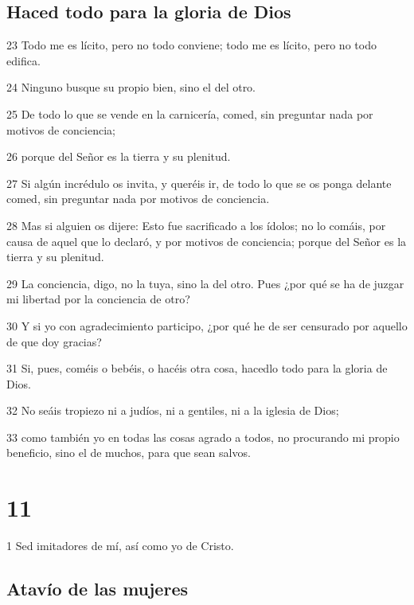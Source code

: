 \section*{Haced todo para la gloria de Dios}

\par 23 Todo me es lícito, pero no todo conviene; todo me es lícito, pero no todo edifica.
\par 24 Ninguno busque su propio bien, sino el del otro.
\par 25 De todo lo que se vende en la carnicería, comed, sin preguntar nada por motivos de conciencia;
\par 26 porque del Señor es la tierra y su plenitud.
\par 27 Si algún incrédulo os invita, y queréis ir, de todo lo que se os ponga delante comed, sin preguntar nada por motivos de conciencia.
\par 28 Mas si alguien os dijere: Esto fue sacrificado a los ídolos; no lo comáis, por causa de aquel que lo declaró, y por motivos de conciencia; porque del Señor es la tierra y su plenitud.
\par 29 La conciencia, digo, no la tuya, sino la del otro. Pues ¿por qué se ha de juzgar mi libertad por la conciencia de otro?
\par 30 Y si yo con agradecimiento participo, ¿por qué he de ser censurado por aquello de que doy gracias?
\par 31 Si, pues, coméis o bebéis, o hacéis otra cosa, hacedlo todo para la gloria de Dios.
\par 32 No seáis tropiezo ni a judíos, ni a gentiles, ni a la iglesia de Dios;
\par 33 como también yo en todas las cosas agrado a todos, no procurando mi propio beneficio, sino el de muchos, para que sean salvos.

\chapter{11}

\par 1 Sed imitadores de mí, así como yo de Cristo.

\section*{Atavío de las mujeres}

